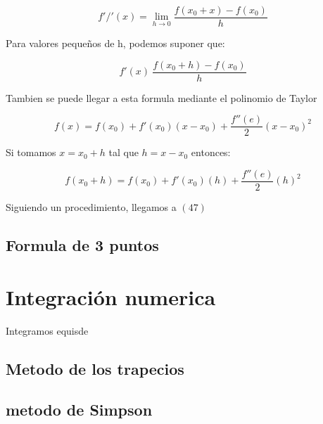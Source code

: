 \documentclass[10pt]{article}
\begin{document}
\begin{equation}
	f'/'(x) = \lim_{h\rightarrow 0} \dfrac{f(x_0 +x)-f(x_0)}{h}
\end{equation}

Para valores pequeños de h, podemos suponer que:

\begin{equation}
	f'(x)~ \dfrac{f(x_0+h)-f(x_0)}{h}
\end{equation}

Tambien se puede llegar a esta formula mediante el polinomio de Taylor

\begin{equation}
	f(x) = f(x_0) + f'(x_0)(x-x_0) + \frac{f''(e)}{2}(x-x_0)^2
\end{equation}

Si tomamos $x = x_0+h$ tal que $h = x-x_0$ entonces:

\begin{equation}
	f(x_0+h) = f(x_0)+f'(x_0)(h)+\frac{f''(e)}{2}(h)^2
\end{equation}

Siguiendo un procedimiento, llegamos a $(47)$

\subsection{Formula de 3 puntos}

\section{Integración numerica}

Integramos equisde

\subsection{Metodo de los trapecios}

\subsection{metodo de Simpson}
\end{document}
